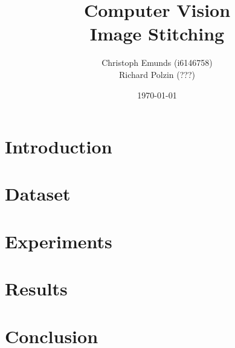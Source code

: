 \documentclass[10pt,a4paper]{article}
\author{Christoph Emunds (i6146758)\\Richard Polzin (???)}
\title{Computer Vision\\Image Stitching}
\date{\today}
\begin{document}
	\maketitle
	
	\tableofcontents
	
	\section{Introduction}
	
	\section{Dataset}
	
	\section{Experiments}
	
	\section{Results}
	
	\section{Conclusion}
	
\end{document}
